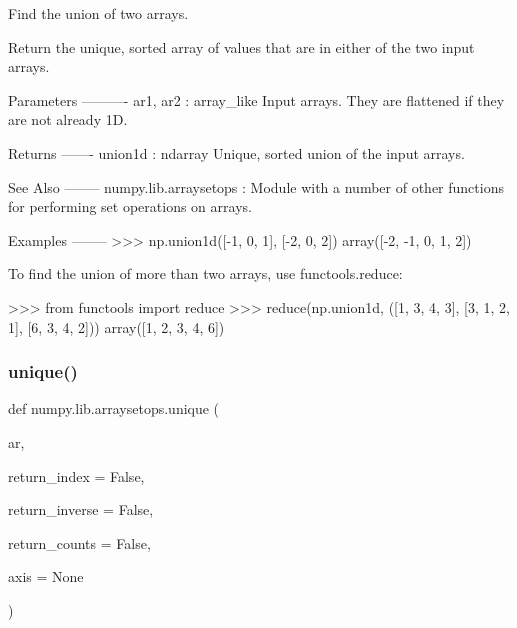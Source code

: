 \begin{DoxyVerb}Find the union of two arrays.

Return the unique, sorted array of values that are in either of the two
input arrays.

Parameters
----------
ar1, ar2 : array_like
    Input arrays. They are flattened if they are not already 1D.

Returns
-------
union1d : ndarray
    Unique, sorted union of the input arrays.

See Also
--------
numpy.lib.arraysetops : Module with a number of other functions for
                        performing set operations on arrays.

Examples
--------
>>> np.union1d([-1, 0, 1], [-2, 0, 2])
array([-2, -1,  0,  1,  2])

To find the union of more than two arrays, use functools.reduce:

>>> from functools import reduce
>>> reduce(np.union1d, ([1, 3, 4, 3], [3, 1, 2, 1], [6, 3, 4, 2]))
array([1, 2, 3, 4, 6])
\end{DoxyVerb}
 \mbox{\label{namespacenumpy_1_1lib_1_1arraysetops_aa904c718a035bed3e6f4ae029c70f509}} 
\subsubsection{\texorpdfstring{unique()}{unique()}}
{\footnotesize\ttfamily def numpy.\+lib.\+arraysetops.\+unique (\begin{DoxyParamCaption}\item[{}]{ar,  }\item[{}]{return\+\_\+index = {\ttfamily False},  }\item[{}]{return\+\_\+inverse = {\ttfamily False},  }\item[{}]{return\+\_\+counts = {\ttfamily False},  }\item[{}]{axis = {\ttfamily None} }\end{DoxyParamCaption})}

